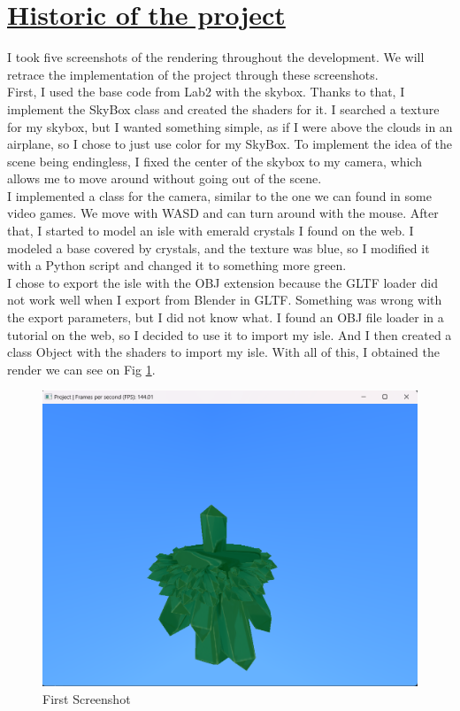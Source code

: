 \documentclass[acmtog,screen,review,nonacm]{acmart}
\begin{document}
\section{\underline{Historic of the project}}
I took five screenshots of the rendering throughout the development. We will retrace the implementation of the project through these  screenshots. 
\\

First, I used the base code from Lab2 with the skybox. Thanks to that, I implement the SkyBox class and created the shaders for it. I searched a texture for my skybox, but I wanted something simple, as if I were above the clouds in an airplane, so I chose to just use color for my SkyBox. To implement the idea of the scene being endingless, I fixed the center of the skybox to my camera, which allows me to move around without going out of the scene.\\
I implemented a class for the camera, similar to the one we can found in some video games. We move with WASD and can turn around with the mouse. After that, I started to model an isle with emerald crystals I found on the web. I modeled a base covered by crystals, and the texture was blue, so I modified it with a Python script and changed it to something more green.\\
I chose to export the isle with the OBJ extension because the GLTF loader did not work well when I export from Blender in GLTF. Something was wrong with the export parameters, but I did not know what. I found an OBJ file loader in a tutorial on the web, so I decided to use it to import my isle. And I then created a class Object with the shaders to import my isle. With all of this, I obtained the render we can see on Fig \ref{fig:Fig 1}.
\begin{figure}[H]
    \centering
    \includegraphics[width=0.5\linewidth]{save/Save1_27_11_2024.png}
    \caption{First Screenshot}
    \label{fig:Fig 1}
\end{figure}
\end{document}
